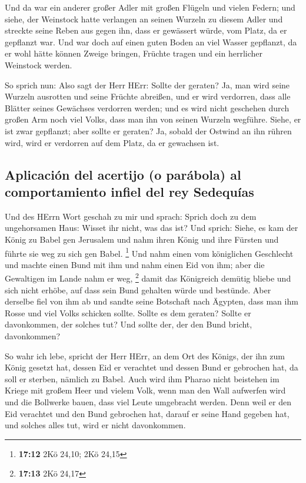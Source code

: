  Und da war ein anderer großer Adler mit großen Flügeln
und vielen Federn; und siehe, der Weinstock hatte verlangen an seinen
Wurzeln zu diesem Adler und streckte seine Reben aus gegen ihn, dass er
gewässert würde, vom Platz, da er gepflanzt war.  Und war
doch auf einen guten Boden an viel Wasser gepflanzt, da er wohl hätte
können Zweige bringen, Früchte tragen und ein herrlicher Weinstock
werden.

 So sprich nun: Also sagt der Herr HErr: Sollte der
geraten? Ja, man wird seine Wurzeln ausrotten und seine Früchte
abreißen, und er wird verdorren, dass alle Blätter seines Gewächses
verdorren werden; und es wird nicht geschehen durch großen Arm noch viel
Volks, dass man ihn von seinen Wurzeln wegführe.  Siehe,
er ist zwar gepflanzt; aber sollte er geraten? Ja, sobald der Ostwind an
ihn rühren wird, wird er verdorren auf dem Platz, da er gewachsen ist.

\hypertarget{aplicaciuxf3n-del-acertijo-o-paruxe1bola-al-comportamiento-infiel-del-rey-sedequuxedas}{%
\subsection{Aplicación del acertijo (o parábola) al comportamiento
infiel del rey
Sedequías}\label{aplicaciuxf3n-del-acertijo-o-paruxe1bola-al-comportamiento-infiel-del-rey-sedequuxedas}}

 Und des HErrn Wort geschah zu mir und sprach:
 Sprich doch zu dem ungehorsamen Haus: Wisset ihr nicht,
was das ist? Und sprich: Siehe, es kam der König zu Babel gen Jerusalem
und nahm ihren König und ihre Fürsten und führte sie weg zu sich gen
Babel. \footnote{\textbf{17:12} 2Kö 24,10; 2Kö 24,15} 
Und nahm einen vom königlichen Geschlecht und machte einen Bund mit ihm
und nahm einen Eid von ihm; aber die Gewaltigen im Lande nahm er weg,
\footnote{\textbf{17:13} 2Kö 24,17}  damit das Königreich
demütig bliebe und sich nicht erhöbe, auf dass sein Bund gehalten würde
und bestünde.  Aber derselbe fiel von ihm ab und sandte
seine Botschaft nach Ägypten, dass man ihm Rosse und viel Volks schicken
sollte. Sollte es dem geraten? Sollte er davonkommen, der solches tut?
Und sollte der, der den Bund bricht, davonkommen?

 So wahr ich lebe, spricht der Herr HErr, an dem Ort des
Königs, der ihn zum König gesetzt hat, dessen Eid er verachtet und
dessen Bund er gebrochen hat, da soll er sterben, nämlich zu Babel.
 Auch wird ihm Pharao nicht beistehen im Kriege mit
großem Heer und vielem Volk, wenn man den Wall aufwerfen wird und die
Bollwerke bauen, dass viel Leute umgebracht werden.  Denn
weil er den Eid verachtet und den Bund gebrochen hat, darauf er seine
Hand gegeben hat, und solches alles tut, wird er nicht davonkommen.

